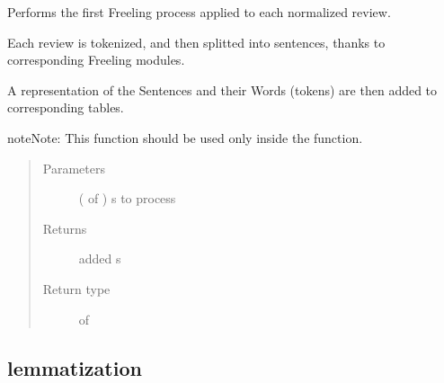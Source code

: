\documentclass[letterpaper,10pt,english]{sphinxmanual}
\begin{document}
\begin{fulllineitems}
\label{\detokenize{process:loacore.process.sentence_process.add_sentences_from_reviews}}
Performs the first Freeling process applied to each normalized review.

Each review is tokenized, and then splitted into sentences, thanks to corresponding Freeling modules.

A representation of the Sentences and their Words (tokens) are then added to corresponding tables.

\begin{sphinxadmonition}{note}{Note:}
This function should be used only inside the  function.
\end{sphinxadmonition}
\begin{quote}\begin{description}
\item[{Parameters}] \leavevmode
{} ( of ) \textendash{}  s to process

\item[{Returns}] \leavevmode
added  s

\item[{Return type}] \leavevmode
{} of 

\end{description}\end{quote}

\end{fulllineitems}



\subsection{lemmatization}
\label{\detokenize{process:module-loacore.process.lemma_process}}\label{\detokenize{process:lemmatization}}
\end{document}
